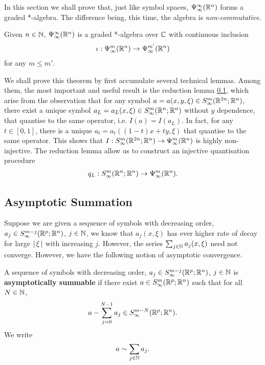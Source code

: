 \documentclass[12pt]{article}
\begin{document}
In this section we shall prove that, just like symbol spaces, $\Psi^\infty_\infty({\mathbb R}^n)$ forms a graded *-algebra. The difference being, this time, the algebra is \emph{non-commutative}. 

\begin{ftheorem}[Summary] 
    Given $n \in {\ensuremath {\mathbb N}}$, $\Psi^\infty_\infty({\mathbb R}^n)$ is a graded *-algebra over ${\mathbb C}$ with continuous inclusion 
    \begin{align*}
        \iota : \Psi^m_\infty({\mathbb R}^n) \to \Psi^{m'}_\infty({\mathbb R}^n)
    \end{align*}
    for any $m \leq m'$. 
\end{ftheorem}

We shall prove this theorem by first accumulate several technical lemmas. Among them, the most important and useful result is the reduction lemma \ref{}, which arise from the observation that for any symbol $a = a(x, y, \xi) \in S^{m}_\infty({\mathbb R}^{2n}; {\mathbb R}^n)$, there exist a unique symbol $a_L = a_L(x, \xi) \in S^{m}_\infty({\mathbb R}^{n}; {\mathbb R}^n)$ without $y$ dependence, that quantise to the same operator, i.e.  $I(a) = I(a_L)$. In fact, for any $t \in [0, 1]$, there is a unique $a_t = a_t((1 - t)x + ty, \xi)$ that quantise to the same operator. This shows that  $I : S^{m}_\infty({\mathbb R}^{2n}; {\mathbb R}^n) \to \Psi^{m}_{\infty}({\mathbb R}^n)$ is highly non-injective. The reduction lemma allow us to construct an injective quantisation procedure
\begin{align*}
q_L : S^{m}_\infty({\mathbb R}^{n}; {\mathbb R}^n) \to \Psi^{m}_{\infty}({\mathbb R}^n). 
\end{align*}


\subsection{Asymptotic Summation}
Suppose we are given a sequence of symbols with decreasing order, $a_j \in S^{m-j}_\infty({\mathbb R}^{p}; {\mathbb R}^n)$, $j \in {\ensuremath {\mathbb N}}$, we know that  $a_j(x, \xi)$ has ever higher rate of decay for large $\left|\, \xi\,\right|$ with increasing $j$. However, the series $\sum_{j \in {\ensuremath {\mathbb N}}} a_j(x, \xi)$ need not converge. However, we have the following notion of asymptotic convergence. 
\begin{fdefinition} 
    A sequence of symbols with decreasing order, $a_j \in S^{m-j}_\infty({\mathbb R}^{p}; {\mathbb R}^n)$, $j \in {\ensuremath {\mathbb N}}$ is \textbf{asymptotically summable} if there exist $a \in S^{m}_\infty({\mathbb R}^{p}; {\mathbb R}^n)$ such that for all $N \in {\ensuremath {\mathbb N}}$, 
    \begin{align*}
        a - \sum_{j = 0}^{N -1} a_j \in S^{m-N}_\infty({\mathbb R}^{p}; {\mathbb R}^n). 
    \end{align*}
    We write
    \begin{align*}
        a \sim \sum_{j \in {\ensuremath {\mathbb N}}} a_j. 
    \end{align*}
\end{fdefinition}
\end{document}
